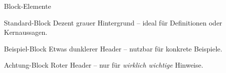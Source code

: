 \begin{frame}{Block-Elemente}
  \begin{block}{Standard-Block}
    Dezent grauer Hintergrund – ideal für Definitionen oder Kernaussagen.
  \end{block}

  \begin{exampleblock}{Beispiel-Block}
    Etwas dunklerer Header – nutzbar für konkrete Beispiele.
  \end{exampleblock}

  \begin{alertblock}{Achtung-Block}
    Roter Header – nur für \emph{wirklich wichtige} Hinweise.
  \end{alertblock}
\end{frame}